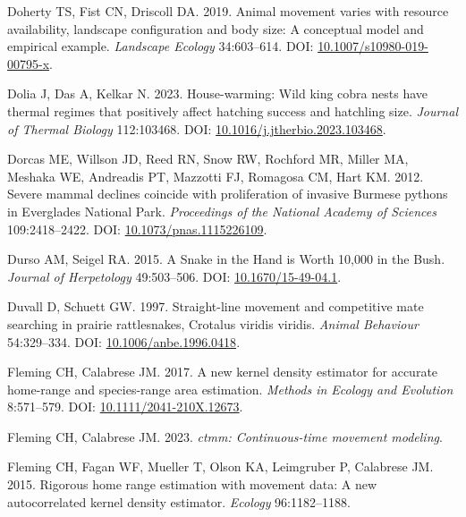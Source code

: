\documentclass[10pt,a4paper]{article}
\newlength{\cslhangindent}
\newenvironment{CSLReferences}[2] %
 {\begin{list}{}{%
  \setlength{\itemindent}{0pt}
  \setlength{\leftmargin}{0pt}
  \setlength{\parsep}{0pt}
  \ifodd #1
   \setlength{\leftmargin}{\cslhangindent}
   \setlength{\itemindent}{-1\cslhangindent}
  \fi
  \setlength{\itemsep}{#2\baselineskip}}}
 {\end{list}}
\begin{document}
\begin{CSLReferences}{1}{0}
Doherty TS, Fist CN, Driscoll DA. 2019. Animal movement varies with resource availability, landscape configuration and body size: A conceptual model and empirical example. \emph{Landscape Ecology} 34:603--614. DOI: \href{https://doi.org/10.1007/s10980-019-00795-x}{10.1007/s10980-019-00795-x}.

Dolia J, Das A, Kelkar N. 2023. House-warming: {Wild} king cobra nests have thermal regimes that positively affect hatching success and hatchling size. \emph{Journal of Thermal Biology} 112:103468. DOI: \href{https://doi.org/10.1016/j.jtherbio.2023.103468}{10.1016/j.jtherbio.2023.103468}.

Dorcas ME, Willson JD, Reed RN, Snow RW, Rochford MR, Miller MA, Meshaka WE, Andreadis PT, Mazzotti FJ, Romagosa CM, Hart KM. 2012. Severe mammal declines coincide with proliferation of invasive {Burmese} pythons in {Everglades} {National} {Park}. \emph{Proceedings of the National Academy of Sciences} 109:2418--2422. DOI: \href{https://doi.org/10.1073/pnas.1115226109}{10.1073/pnas.1115226109}.

Durso AM, Seigel RA. 2015. A {Snake} in the {Hand} is {Worth} 10,000 in the {Bush}. \emph{Journal of Herpetology} 49:503--506. DOI: \href{https://doi.org/10.1670/15-49-04.1}{10.1670/15-49-04.1}.

Duvall D, Schuett GW. 1997. Straight-line movement and competitive mate searching in prairie rattlesnakes, {Crotalus} viridis viridis. \emph{Animal Behaviour} 54:329--334. DOI: \href{https://doi.org/10.1006/anbe.1996.0418}{10.1006/anbe.1996.0418}.

Fleming CH, Calabrese JM. 2017. A new kernel density estimator for accurate home-range and species-range area estimation. \emph{Methods in Ecology and Evolution} 8:571--579. DOI: \href{https://doi.org/10.1111/2041-210X.12673}{10.1111/2041-210X.12673}.

Fleming CH, Calabrese JM. 2023. \emph{{ctmm}: Continuous-time movement modeling}.

Fleming CH, Fagan WF, Mueller T, Olson KA, Leimgruber P, Calabrese JM. 2015. Rigorous home range estimation with movement data: {A} new autocorrelated kernel density estimator. \emph{Ecology} 96:1182--1188.


\end{CSLReferences}
\end{document}
